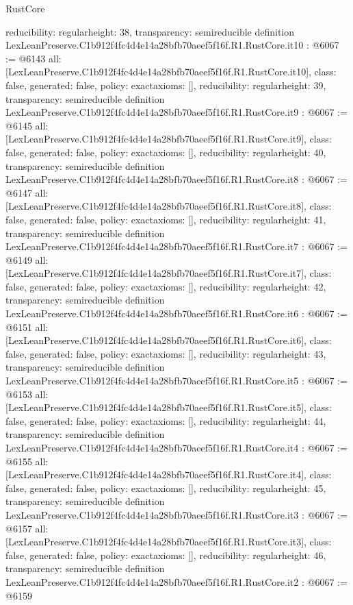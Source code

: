 \begin{lexlean}{RustCore}
\begin{coremodule}
{  reducibility: regular{height: 38},
  transparency: semireducible
}
definition LexLeanPreserve.C1b912f4fc4d4e14a28bfb70aeef5f16f.R1.RustCore.it10 : @6067 := @6143 {
  all: [LexLeanPreserve.C1b912f4fc4d4e14a28bfb70aeef5f16f.R1.RustCore.it10],
  class: false,
  generated: false,
  policy: exact{axioms: []},
  reducibility: regular{height: 39},
  transparency: semireducible
}
definition LexLeanPreserve.C1b912f4fc4d4e14a28bfb70aeef5f16f.R1.RustCore.it9 : @6067 := @6145 {
  all: [LexLeanPreserve.C1b912f4fc4d4e14a28bfb70aeef5f16f.R1.RustCore.it9],
  class: false,
  generated: false,
  policy: exact{axioms: []},
  reducibility: regular{height: 40},
  transparency: semireducible
}
definition LexLeanPreserve.C1b912f4fc4d4e14a28bfb70aeef5f16f.R1.RustCore.it8 : @6067 := @6147 {
  all: [LexLeanPreserve.C1b912f4fc4d4e14a28bfb70aeef5f16f.R1.RustCore.it8],
  class: false,
  generated: false,
  policy: exact{axioms: []},
  reducibility: regular{height: 41},
  transparency: semireducible
}
definition LexLeanPreserve.C1b912f4fc4d4e14a28bfb70aeef5f16f.R1.RustCore.it7 : @6067 := @6149 {
  all: [LexLeanPreserve.C1b912f4fc4d4e14a28bfb70aeef5f16f.R1.RustCore.it7],
  class: false,
  generated: false,
  policy: exact{axioms: []},
  reducibility: regular{height: 42},
  transparency: semireducible
}
definition LexLeanPreserve.C1b912f4fc4d4e14a28bfb70aeef5f16f.R1.RustCore.it6 : @6067 := @6151 {
  all: [LexLeanPreserve.C1b912f4fc4d4e14a28bfb70aeef5f16f.R1.RustCore.it6],
  class: false,
  generated: false,
  policy: exact{axioms: []},
  reducibility: regular{height: 43},
  transparency: semireducible
}
definition LexLeanPreserve.C1b912f4fc4d4e14a28bfb70aeef5f16f.R1.RustCore.it5 : @6067 := @6153 {
  all: [LexLeanPreserve.C1b912f4fc4d4e14a28bfb70aeef5f16f.R1.RustCore.it5],
  class: false,
  generated: false,
  policy: exact{axioms: []},
  reducibility: regular{height: 44},
  transparency: semireducible
}
definition LexLeanPreserve.C1b912f4fc4d4e14a28bfb70aeef5f16f.R1.RustCore.it4 : @6067 := @6155 {
  all: [LexLeanPreserve.C1b912f4fc4d4e14a28bfb70aeef5f16f.R1.RustCore.it4],
  class: false,
  generated: false,
  policy: exact{axioms: []},
  reducibility: regular{height: 45},
  transparency: semireducible
}
definition LexLeanPreserve.C1b912f4fc4d4e14a28bfb70aeef5f16f.R1.RustCore.it3 : @6067 := @6157 {
  all: [LexLeanPreserve.C1b912f4fc4d4e14a28bfb70aeef5f16f.R1.RustCore.it3],
  class: false,
  generated: false,
  policy: exact{axioms: []},
  reducibility: regular{height: 46},
  transparency: semireducible
}
definition LexLeanPreserve.C1b912f4fc4d4e14a28bfb70aeef5f16f.R1.RustCore.it2 : @6067 := @6159 {
}
\end{coremodule}
\end{lexlean}
